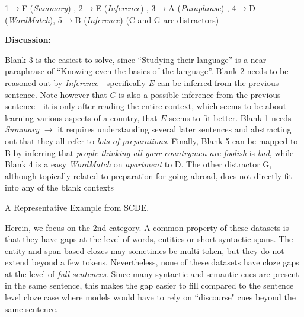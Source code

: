 \documentclass[11pt,a4paper]{article}
\newcommand{\dsname}{\textsc{SCDE}}
\begin{document}
\begin{table*}[!ht]
{\begin{minipage}[t]{445pt}
{1$\rightarrow$F (\textit{Summary}) , 2$\rightarrow$E (\textit{Inference}) , 3$\rightarrow$A (\textit{Paraphrase}) , 4$\rightarrow$D (\textit{WordMatch}), 5$\rightarrow$B (\textit{Inference}) (C and G are distractors)

{\bf Discussion:}

Blank 3 is the easiest to solve, since ``Studying their language'' is a near-paraphrase of ``Knowing even the basics of the language''. Blank 2 needs to be reasoned out by \textit{Inference} - specifically $E$ can be inferred from the previous sentence. Note however that $C$ is also a possible inference from the previous sentence - it is only after reading the entire context, which seems to be about learning various aspects of a country, that $E$ seems to fit better. Blank 1 needs \textit{Summary} $\rightarrow$ it requires understanding several later sentences and abstracting out that they all refer to \emph{lots of preparations}. Finally, Blank 5 can be mapped to B by inferring that \textit{people thinking all your countrymen are foolish} is \emph{bad}, while Blank 4 is a easy \textit{WordMatch} on \textit{apartment} to D. The other distractor G, although topically related to preparation for going abroad, does not directly fit into any of the blank contexts
}
\end{minipage}}
\caption{A Representative Example from \dsname.}
\label{tab:mainExample}
\vspace{-2ex}
\end{table*}



Herein, we focus on the 2nd category. A common property of these datasets is that they have gaps at the level of words, entities or short syntactic spans. The entity and span-based clozes may sometimes be multi-token, but they do not extend beyond a few tokens. Nevertheless, none of these datasets have cloze gaps at the level of \emph{full sentences}. Since many syntactic and semantic cues are present in the same sentence, this makes the gap easier to fill compared to the sentence level cloze case where models would have to rely on ``discourse" cues beyond the same sentence. 
\end{document}
